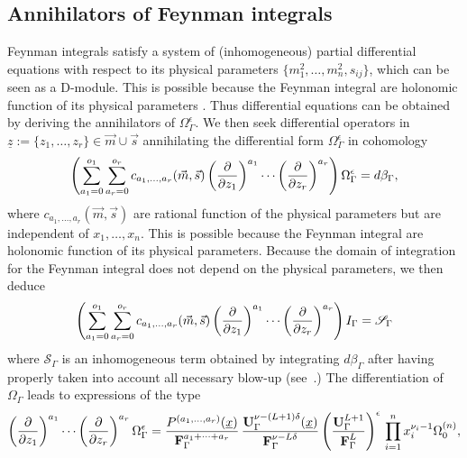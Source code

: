 \documentclass[a4paper,12pt]{article}
\newcommand\lNote[1]{
	\todo[backgroundcolor=red!20!white,fancyline,
	bordercolor=white]{ LDLC:  #1}}
\numberwithin{equation}{section}
\numberwithin{figure}{section}
\begin{document}
\subsection{Annihilators of Feynman integrals}
Feynman integrals satisfy a system of  (inhomogeneous) partial
differential equations with respect to its physical parameters
$ \{m_1^2,\dots,m_n^2,s_{ij}\}$, which can be seen as a D-module. This is possible
because the Feynman integral are holonomic function of its physical parameters \cite{Kashiwara:1977nf}.  Thus differential equations can be obtained by deriving the annihilators  of  $\Omega_\Gamma^\epsilon$.
We then seek differential operators in $\underline
z:=\{z_1,\dots,z_r\} \in \vec m \cup \vec s$
annihilating the differential form $\Omega_\Gamma^\epsilon$ in cohomology
\begin{equation}\label{e:PFOmegaGeneric}
\left(  \sum_{a_1=0}^{o_1} \sum_{ a_r=0}^{o_r}  c_{a_1,\dots, a_r}(\vec m,\vec s) \left(\partial\over \partial z_1\right)^{a_1}\cdots\left(\partial
  \over\partial z_r\right)^{a_r}  \right)\Omega_\Gamma^\epsilon=d\beta_\Gamma,
\end{equation}
where $  c_{a_1,\dots, a_r}(\vec m,\vec s)$ are rational function of the physical
parameters but are independent of $x_1,\dots,x_n$.  This is possible
because the Feynman integral are holonomic function of its physical parameters.
Because the domain of integration for the Feynman integral does not
depend on the physical parameters, we then deduce
\begin{equation}\label{e:PDEintFeynman}
  \left( \sum_{a_1=0}^{o_1} \sum_{ a_r=0}^{o_r}  c_{a_1,\dots, a_r}(\vec m,\vec s) \left(\partial\over \partial z_1\right)^{a_1}\cdots\left(\partial
  \over\partial z_r\right)^{a_r}  \right)I_\Gamma=\mathscr{S}_\Gamma
\end{equation}
where $\mathscr{S}_\Gamma$ is an inhomogeneous term obtained by
integrating $d\beta_\Gamma$ after having properly taken into account
all necessary blow-up (see~\cite{bek,Brown:2009ta,Bloch:2016izu,muller2014picard}.) The    differentiation of $\Omega_\Gamma$ 
leads  to  expressions of the type \lNote{notation for $a_1+\dots+a_r$}
\begin{equation}\label{e:PDE}
\left(\partial\over \partial z_1\right)^{a_1}\cdots\left(\partial
  \over\partial z_r\right)^{a_r} \Omega_\Gamma^\epsilon=
{  P^{(a_1,\dots,a_r)}(\underline x)\over \textbf{F}_\Gamma^{a_1+\cdots +a_r}}\, { \textbf{U}_\Gamma^{\nu-(L+1)\delta} (\underline x)\over \textbf{F}_\Gamma^{\nu-L\delta}}
  \left(\textbf{U}_\Gamma^{L+1}\over \textbf{F}_\Gamma^L\right)^{\epsilon} \, \prod_{i=1}^n x_i^{\nu_i-1} \Omega^{(n)}_0  ,
\end{equation}
\end{document}
